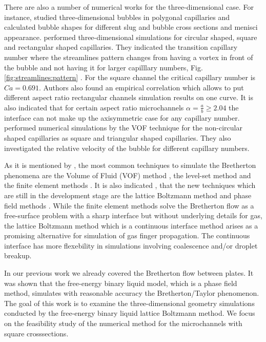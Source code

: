 \documentclass{article}
\begin{document}
There are also a number of numerical works for the three-dimensional case. For instance, 
\citet{wong-films,wong-pressure} studied
three-dimensional bubbles in
polygonal capillaries and calculated bubble shapes for different
slug and bubble cross sections and menisci appearance.
\citet{heil-threedim} performed three-dimensional simulations for circular shaped,
square and rectangular shaped capillaries. They indicated the transition
capillary number where the streamlines pattern
changes from having a vortex in front of the bubble and not having it for larger capilllary
numbers, {\color{red} Fig. \ref{fig:streamlines:pattern} }. For the square channel the critical
capillary number is $Ca=0.691$.  Authors also found an empirical correlation which
allows to put
different aspect ratio rectangular channels simulation results on one
curve. It is also indicated that for certain aspect ratio microchannels $\alpha=\frac{a}{b}\geq
2.04$ the interface can not make up the
axisymmetric case for any capillary number. \citet{wang-non-circular} performed numerical
simulations by the VOF technique for the
non-circular
shaped capillaries as square and triangular shaped capillaries. They also investigated the relative
velocity of the bubble for
different capillary numbers. 

As it is mentioned by \citet{gupta-review}, the most common techniques to simulate the Bretherton
phenomena are the Volume of Fluid (VOF) method \cite{wang-non-circular}, the level-set method
\cite{fukugata-levelset} and the finite element methods \cite{kreutzer-taylor,heil-threedim}. It is
also indicated \cite{gupta-review}, that the new techniques which are still in the development stage
are the lattice Boltzmann method and phase field methods \cite{anderson-diffuse,gurtin-binary}.
While the finite element methods solve the Bretherton flow as a free-surface problem with a sharp
interface but without underlying details for gas, the lattice Boltzmann method which is a continuous
interface method arises as a promising alternative for simulation of gas finger propagation. The
continuous interface has more flexebility in simulations involving coalescence and/or droplet
breakup.

In our previous work \cite{kuzmin-binary2d} we already covered the Bretherton flow between plates.
It was shown that the free-energy binary liquid model, which is a phase field method, simulates
with reasonable accuracy the Bretherton/Taylor phenomenon. The goal of this work is to examine the
three-dimensional geometry simulations conducted by the free-energy binary liquid lattice Boltzmann
method. We focus on the feasibility study of the numerical method for the microchannels with
square crosssections. 
\end{document}
